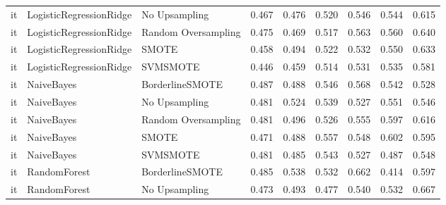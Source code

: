 \begin{tabular}{lllllllll}
      it &      LogisticRegressionRidge &       No Upsampling & 0.467 &                     0.476 &                 0.520 &                  0.546 &                                   0.544 &     0.615 \\
      it &      LogisticRegressionRidge & Random Oversampling & 0.475 &                     0.469 &                 0.517 &                  0.563 &                                   0.560 &     0.640 \\
      it &      LogisticRegressionRidge &               SMOTE & 0.458 &                     0.494 &                 0.522 &                  0.532 &                                   0.550 &     0.633 \\
      it &      LogisticRegressionRidge &            SVMSMOTE & 0.446 &                     0.459 &                 0.514 &                  0.531 &                                   0.535 &     0.581 \\
      it &                   NaiveBayes &     BorderlineSMOTE & 0.487 &                     0.488 &                 0.546 &                  0.568 &                                   0.542 &     0.528 \\
      it &                   NaiveBayes &       No Upsampling & 0.481 &                     0.524 &                 0.539 &                  0.527 &                                   0.551 &     0.546 \\
      it &                   NaiveBayes & Random Oversampling & 0.481 &                     0.496 &                 0.526 &                  0.555 &                                   0.597 &     0.616 \\
      it &                   NaiveBayes &               SMOTE & 0.471 &                     0.488 &                 0.557 &                  0.548 &                                   0.602 &     0.595 \\
      it &                   NaiveBayes &            SVMSMOTE & 0.481 &                     0.485 &                 0.543 &                  0.527 &                                   0.487 &     0.548 \\
      it &                 RandomForest &     BorderlineSMOTE & 0.485 &                     0.538 &                 0.532 &                  0.662 &                                   0.414 &     0.597 \\
      it &                 RandomForest &       No Upsampling & 0.473 &                     0.493 &                 0.477 &                  0.540 &                                   0.532 &     0.667 \\

\end{tabular}
